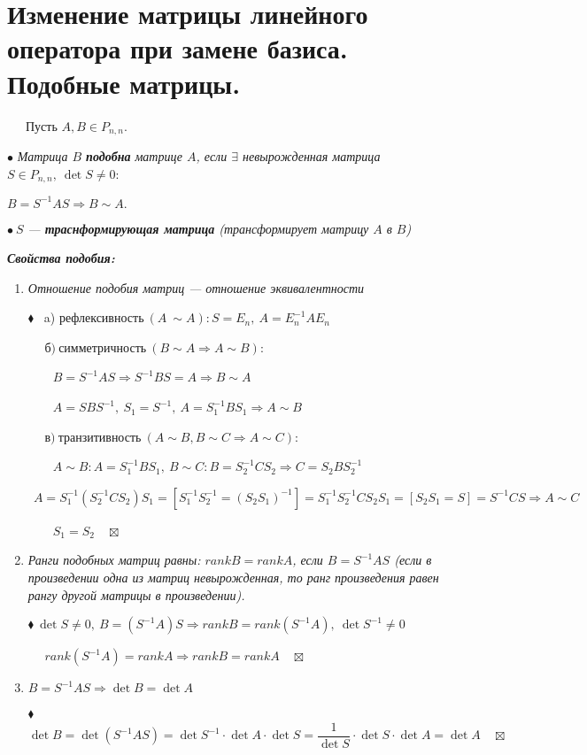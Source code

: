 \documentclass[a4paper, 12pt]{report}
\begin{document}
	
	
	
	
	
	
	
	
	\section{Изменение матрицы линейного оператора при замене базиса. Подобные матрицы.}
	$\quad \;\ $Пусть $A, B \in P_{n,n}.$
	
	$\bullet$\textit{ Матрица $B$ \textbf{подобна} матрице $A$, если $\exists$ невырожденная матрица $S  \in P_{n,n}, \ \det S \not= 0$}:
	
	$B = S^{-1}AS \Rightarrow B \sim A.$
	
	$\bullet \ S$ \textit{--- \textbf{траснформирующая матрица} (трансформирует матрицу $A$ в $B$)}
	\par\bigskip
	\textit{ \textbf{Свойства подобия:}}
	\begin{enumerate}
		\item  \textit{Отношение подобия матриц} \textit{--- отношение эквивалентности}
		
		$\blacklozenge$ \ a)  рефлексивность$ \ (A \ \sim A): S = E_n,  \ A = E_n^{-1}AE_n$
		
		$\quad$ $ $б$) \ $симметричность$ \ (B \sim A \Rightarrow A \sim B) :$
		
		$\quad$ $ \ \ \  B = S^{-1}AS \Rightarrow S^{-1}BS  = A \Rightarrow B \sim A$
		
		$\quad$ $ \ \ \  A = SBS^{-1}, \ S_1 = S^{-1}, \ A = S_1^{-1}BS_1 \Rightarrow A \sim B$
		
		$\quad$ $ $в$) \ $транзитивность$ \ (A \sim B, B \sim C \Rightarrow A \sim C) :$
		
		$\quad$  $\ \ \  A \sim B : A = S_1^{-1}BS_1, \ B \sim C : B = S_2^{-1}CS_2 \Rightarrow C = S_2BS_2^{-1}$
		
		$\quad$ $\ \  A= S_1^{-1}(S_2^{-1}CS_2)S_1 = [S_1^{-1}S_2^{-1} = (S_2S_1)^{-1}] = S_1^{-1}S_2^{-1}CS_2S_1 = [S_2S_1 = S] = S^{-1}CS \Rightarrow A \sim C$
		
		$\quad$ $ \ \ \ S_1 = S_2 \quad \boxtimes$
		
		\item  \textit{Ранги подобных матриц равны:  $rankB = rankA$, если $B = S^{-1}AS$ (если в произведении одна из матриц невырожденная, то ранг произведения равен рангу другой матрицы в произведении).}
		
		
		$\blacklozenge \ \det S \not= 0, \ B = (S^{-1}A)S \Rightarrow rank B = rank (S^{-1}A), \ \det S^{-1} \not= 0$ 
		
		$\quad$ $rank(S^{-1}A) = rank A \Rightarrow rank B = rank A \quad \boxtimes$
		
		\item \textit {$B = S^{-1}AS \Rightarrow \det B = \det A$}
		
		$\blacklozenge$ \ $ \det B = \det (S^{-1}AS) = \det S^{-1} \cdot \det A \cdot \det S = \dfrac 1{\det S} \cdot \det S \cdot \det A = \det A \quad \boxtimes$
		
		\par\bigskip
	\end{enumerate}
\end{document}
